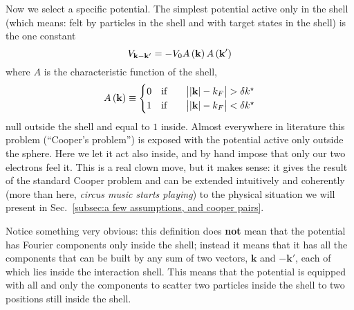 Now we select a specific potential. The simplest potential active only in the shell (which means: felt by particles in the shell and with target states in the shell) is the one constant
\[
	V_{\mathbf{k}-\mathbf{k}'} = - V_0 A\left({\mathbf{k}}\right) A\left({\mathbf{k}'}\right)
\]
where $A$ is the characteristic function of the shell,
\[
	A\lrR{\mathbf{k}} \equiv \begin{cases}
		0 \qq{if} &\abs{\abs{\mathbf{k}}-k_F \vphantom{A^A}} > \delta k^\star \\
		1 \qq{if} &\abs{\abs{\mathbf{k}}-k_F \vphantom{A^A}} < \delta k^\star	\end{cases}
\]
null outside the shell and equal to $1$ inside. Almost everywhere in literature this problem (``Cooper's problem'') is exposed with the potential active only outside the sphere. Here we let it act also inside, and by hand impose that only our two electrons feel it. This is a real clown move, but it makes sense: it gives the result of the standard Cooper problem and can be extended intuitively and coherently (more than here, \textit{circus music starts playing}) to the physical situation we will present in Sec.~\ref{subsec:a few assumptions, and cooper pairs}.

Notice something very obvious: this definition does \textbf{not} mean that the potential has Fourier components only inside the shell; instead it means that it has all the components that can be built by any sum of two vectors, $\mathbf{k}$ and $-\mathbf{k}'$, each of which lies inside the interaction shell. This means that the potential is equipped with all and only the components to scatter two particles inside the shell to two positions still inside the shell.

